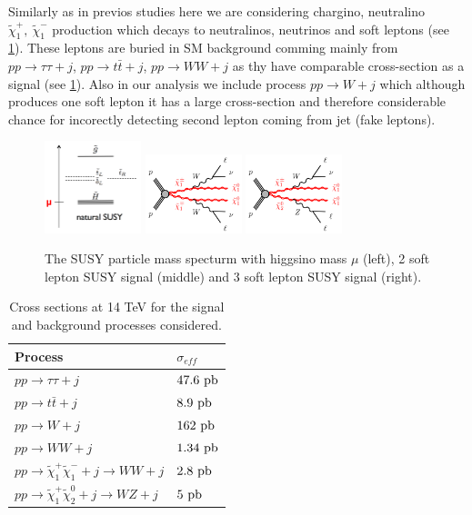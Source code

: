 \documentclass[tightenline,notitlepage,nofootinbib]{revtex4-1}
\begin{document}
Similarly as in previos studies \cite{PhysRevD.89.075007} here we are considering chargino, neutralino $\tilde \chi_1^{+},~\tilde \chi_1^{-}$ production which decays to neutralinos, neutrinos and soft leptons (see \cref{fig:basic}). These leptons are buried in SM background comming mainly from $pp\to \tau \tau + j$, $pp\to t \bar t + j$, $pp \to WW + j$ as thy have comparable cross-section as a signal (see \cref{tab:cross}). Also in our analysis we include process $pp \to W +j$ which although produces one soft lepton it has a large cross-section and therefore considerable chance for incorectly detecting second lepton coming from jet (fake leptons). 
\begin{figure}[!ht]
    \centering
    \includegraphics[width=0.25\textwidth]{splittings.png}
    \includegraphics[width=0.25\textwidth]{C1C1.png}
    \includegraphics[width=0.25\textwidth]{C1N2.png}
    \caption{The SUSY particle mass specturm with higgsino mass $\mu$ (left), 2 soft lepton SUSY signal (middle) and 3 soft lepton SUSY signal (right).}
    \label{fig:basic}
  \end{figure}

\begin{table}[!ht]
  \centering
  \begin{tabular}{ll}
    Process & $\sigma_{eff}$ \\
    \hline
    $pp\rightarrow \tau \tau + j$ & $47.6~\rm{pb}$\\
    $pp\rightarrow t \bar t + j$ & $ 8.9~\rm{pb}$\\
    $pp \rightarrow W + j$ &  $162~\rm{pb}$ \\
    $pp \rightarrow WW +j$ & $1.34~\rm{pb}$\\
    $pp \rightarrow \tilde \chi_1^{+}\tilde \chi_1^{-} + j \rightarrow WW + j$ & $2.8~\rm{pb}$\\
    $pp \rightarrow \tilde \chi_1^{+}\tilde \chi_2^{0} + j \rightarrow WZ + j$ & $5~\rm{pb}$\\
  \end{tabular}
  \caption{Cross sections at 14 TeV for the signal and background processes considered.}
  \label{tab:cross}
\end{table}
\end{document}
